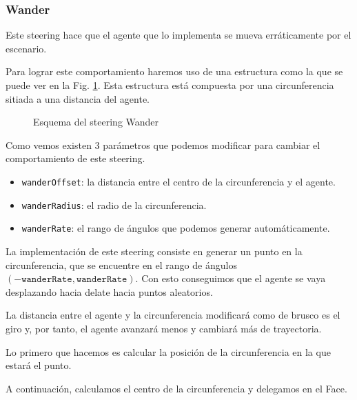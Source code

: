\subsubsection{Wander}

Este steering hace que el agente que lo implementa se mueva erráticamente por el escenario.

Para lograr este comportamiento haremos uso de una estructura como la que se puede ver en la Fig. \ref{fig:wander}. Esta estructura está compuesta por una circunferencia sitiada a una distancia del agente.

\begin{figure}[H]
    \centering
    
    \caption{Esquema del steering Wander}
    \label{fig:wander}
\end{figure}

Como vemos existen 3 parámetros que podemos modificar para cambiar el comportamiento de este steering.
\begin{itemize}
    \item \texttt{wanderOffset}: la distancia entre el centro de la circunferencia y el agente.
    \item \texttt{wanderRadius}: el radio de la circunferencia.
    \item \texttt{wanderRate}: el rango de ángulos que podemos generar automáticamente.
\end{itemize}
 
La implementación de este steering consiste en generar un punto en la circunferencia, que se encuentre en el rango de ángulos $(-\texttt{wanderRate}, \texttt{wanderRate})$. Con esto conseguimos que el agente se vaya desplazando hacia delate hacia puntos aleatorios.

La distancia entre el agente y la circunferencia modificará como de brusco es el giro y, por tanto, el agente avanzará menos y cambiará más de trayectoria.

Lo primero que hacemos es calcular la posición de la circunferencia en la que estará el punto.



A continuación, calculamos el centro de la circunferencia y delegamos en el Face.


